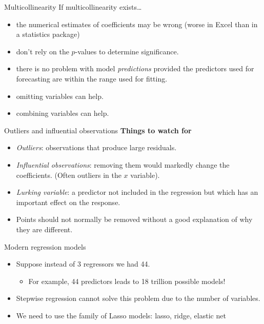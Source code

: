 \documentclass[
  14pt,
  ignorenonframetext,
  aspectratio=169,
]{beamer}
\providecommand{\tightlist}{%
  \setlength{\itemsep}{0pt}\setlength{\parskip}{0pt}}
\begin{document}
\begin{frame}{Multicollinearity}
\protect{}\label{multicollinearity-1}
If multicollinearity exists\dots

\begin{itemize}
\tightlist
\item
  the numerical estimates of coefficients may be wrong (worse in Excel
  than in a statistics package)
\item
  don't rely on the \(p\)-values to determine significance.
\item
  there is no problem with model \emph{predictions} provided the
  predictors used for forecasting are within the range used for fitting.
\item
  omitting variables can help.
\item
  combining variables can help.
\end{itemize}
\end{frame}

\begin{frame}{Outliers and influential observations}
\protect{}\label{outliers-and-influential-observations}
\textbf{Things to watch for}

\begin{itemize}
\tightlist
\item
  \emph{Outliers}: observations that produce large residuals.
\item
  \emph{Influential observations}: removing them would markedly change
  the coefficients. (Often outliers in the \(x\) variable).
\item
  \emph{Lurking variable}: a predictor not included in the regression
  but which has an important effect on the response.
\item
  Points should not normally be removed without a good explanation of
  why they are different.
\end{itemize}
\end{frame}

\begin{frame}{Modern regression models}
\protect{}\label{modern-regression-models}
\begin{itemize}
\tightlist
\item
  Suppose instead of 3 regressors we had 44.

  \begin{itemize}
  \tightlist
  \item
    For example, 44 predictors leads to 18 trillion possible models!
  \end{itemize}
\item
  Stepwise regression cannot solve this problem due to the number of
  variables.
\item
  We need to use the family of Lasso models: lasso, ridge, elastic net
\end{itemize}
\end{frame}
\end{document}
